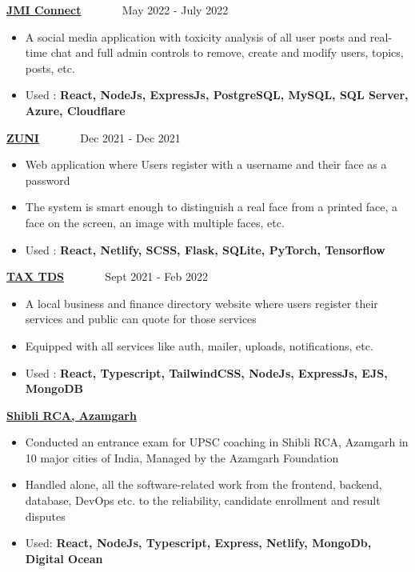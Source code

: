 \documentclass[10pt,a4paper,ragged2e,withhyper]{altacv}
\begin{document}
\begin{paracol}{2}
\divider

\large \textcolor{VividPurple}{\href{https://github.com/m3rashid/DBMS_Project}{\textbf{JMI Connect}}} ~~~~~~ \normalsize \faCalendar May 2022 - July 2022
\begin{itemize}
  \item A social media application with toxicity analysis of all user posts and real-time chat and full admin controls to remove, create and modify users, topics, posts, etc.
  \item Used : \textcolor{VividPurple}{\textbf{React, NodeJs, ExpressJs, PostgreSQL, MySQL, SQL Server, Azure, Cloudflare }}
\end{itemize}
 
\divider

\large \textcolor{VividPurple}{\href{https://github.com/sheikhazhanmohammed/ZUNI}{\textbf{ZUNI}}} ~~~~~~ \normalsize \faCalendar Dec 2021 - Dec 2021
\begin{itemize}
  \item Web application where Users register with a username and their face as a password
  \item The system is smart enough to distinguish a real face from a printed face, a face on the screen, an image with multiple faces, etc.
  \item Used : \textcolor{VividPurple}{\textbf{React, Netlify, SCSS, Flask, SQLite, PyTorch, Tensorflow }}
\end{itemize}

\divider

\large \textcolor{VividPurple}{\href{https://github.com/m3rashid/taxtds-new}{\textbf{TAX TDS}}} ~~~~~~ \normalsize \faCalendar Sept 2021 - Feb 2022
\begin{itemize}
  \item A local business and finance directory website where users register their services and public can quote for those services
  \item Equipped with all services like auth, mailer, uploads, notifications, etc.
  \item Used : \textcolor{VividPurple}{\textbf{React, Typescript, TailwindCSS, NodeJs, ExpressJs, EJS, MongoDB }}
\end{itemize}

\switchcolumn


\large \textcolor{VividPurple}{\href{https://shiblirca.in}{\textbf{Shibli RCA, Azamgarh}}} 
\begin{itemize}
    \item Conducted an entrance exam for UPSC coaching in Shibli RCA, Azamgarh in 10 major cities of India, Managed by the Azamgarh Foundation
    \item Handled alone, all the software-related work from the frontend, backend, database, DevOps etc. to the reliability, candidate enrollment and result disputes
    \item Used: \textcolor{VividPurple}{\textbf{React, NodeJs, Typescript, Express, Netlify, MongoDb, Digital Ocean}}
\end{itemize}


\end{paracol}
\end{document}
